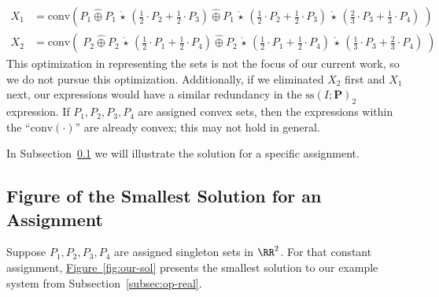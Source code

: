 \documentclass[10pt]{amsart}
\theoremstyle{plain}
\theoremstyle{definition}
\providecommand{\namedref}[2]{\hyperref[#2]{#1~\ref*{#2}}\xspace}
\providecommand{\figureref}[1]{\namedref{Figure}{fig:#1}}
\providecommand{\bP}[0]{\ensuremath{\mathbf P}\xspace}
\providecommand{\cplus}[0]{\ensuremath{\hat{\oplus}}\xspace}
\providecommand{\cmult}[0]{\ensuremath{{\,\mathring{\star}\,}}\xspace}
\providecommand{\conv}[1]{\ensuremath{\mathrm{conv}{\left({#1}\right)}\xspace}}
\providecommand{\ssol}{\ensuremath{\mathrm{ss}}\xspace}
\begin{document}
    \begin{align*}
        X_1 &= \conv{ P_1 \cplus P_1\cmult\left(\frac12\cdot P_2 + \frac12\cdot P_3\right) \cplus P_1\cmult\left(\frac12\cdot P_2 + \frac12\cdot P_3\right)\cmult\left(\frac23\cdot P_3 + \frac13\cdot P_4\right) \;}\\
        X_2 &=\conv{\; P_2 \cplus P_2\cmult\left(\frac12\cdot P_1 + \frac12\cdot P_4\right) 
            \cplus P_2\cmult\left(\frac12\cdot P_1+\frac12\cdot P_4\right)\cmult \left(\frac13\cdot P_3 + \frac23\cdot P_4\right) \;}
    \end{align*}
This optimization in representing the sets is not the focus of our current work, so we do not pursue this optimization.
Additionally, if we eliminated $X_2$ first and $X_1$ next, our expressions would have a similar redundancy in the $\ssol(I;\bP)_2$ expression. 
If $P_1, P_2, P_3, P_4$ are assigned convex sets, then the expressions within the ``$\conv{\cdot}$'' are already convex; this may not hold in general. 

In Subsection~\ref{subsec:fig-smallest-sol-eg} we will illustrate the solution for a specific assignment. 





\subsection{Figure of the Smallest Solution for an Assignment}
\label{subsec:fig-smallest-sol-eg}

Suppose $P_1, P_2, P_3, P_4$ are assigned singleton sets in $\RR^2$. 
For that constant assignment, \figureref{our-sol} presents the smallest solution to our example system from Subsection~\ref{subsec:op-real}. 
\end{document}
